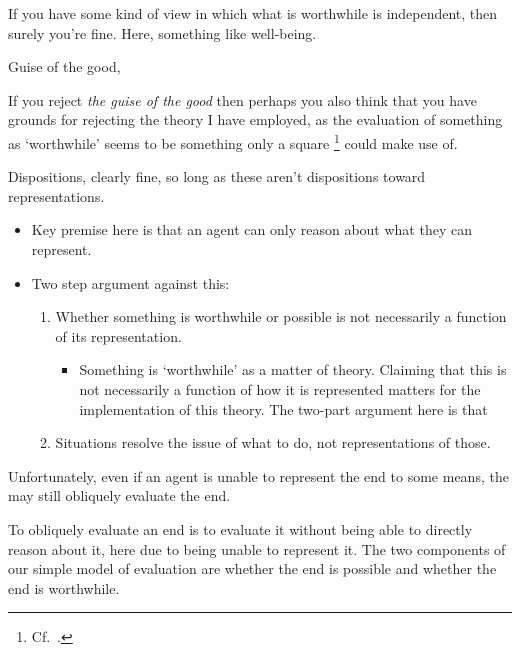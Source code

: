 \documentclass[10pt]{article}
\begin{document}
If you have some kind of view in which what is worthwhile is independent, then surely you're fine.
Here, something like well-being.

Guise of the good,

If you reject \emph{the guise of the good} then perhaps you also think that you have grounds for rejecting the theory I have employed, as the evaluation of something as `worthwhile' seems to be something only a square\nolinebreak
\footnote{Cf.\ \textcite{Velleman:1992aa}.}
could make use of.


Dispositions, clearly fine, so long as these aren't dispositions toward representations.



\begin{itemize}
\item Key premise here is that an agent can only reason about what they can represent.
\item Two step argument against this:
  \begin{enumerate}
  \item Whether something is worthwhile or possible is not necessarily a function of its representation.
    \begin{itemize}
    \item Something is `worthwhile' as a matter of theory.
      Claiming that this is not necessarily a function of how it is represented matters for the implementation of this theory.
      The two-part argument here is that

    \end{itemize}
  \item Situations resolve the issue of what to do, not representations of those.
  \end{enumerate}
\end{itemize}




Unfortunately, even if an agent is unable to represent the end to some means, the may still obliquely evaluate the end.

To obliquely evaluate an end is to evaluate it without being able to directly reason about it, here due to being unable to represent it.
The two components of our simple model of evaluation are whether the end is possible and whether the end is worthwhile.
\end{document}
